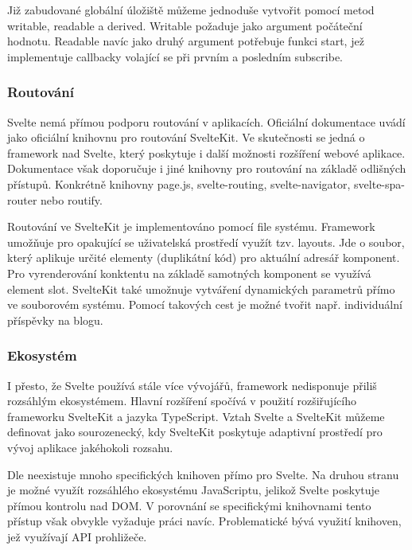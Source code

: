 Již zabudované globální úložiště můžeme jednoduše vytvořit pomocí metod writable, readable a derived. Writable požaduje jako argument počáteční hodnotu. 
Readable navíc jako druhý argument potřebuje funkci start, jež implementuje callbacky volající se při prvním a posledním subscribe.\cite{sveltehandbook,svelte,sveltestatemanagement}

\subsubsection{Routování}

Svelte nemá přímou podporu routování v aplikacích. Oficiální dokumentace uvádí jako oficiální knihovnu pro routování SvelteKit. 
Ve skutečnosti se jedná o framework nad Svelte, který poskytuje i další možnosti rozšíření webové aplikace. 
Dokumentace však doporučuje i jiné knihovny pro routování na základě odlišných přístupů. 
Konkrétně knihovny page.js, svelte-routing, svelte-navigator, svelte-spa-router nebo routify.\cite{svelte,svelteforbeginners}

Routování ve SvelteKit je implementováno pomocí file systému. Framework umožňuje pro opakující se uživatelská prostředí využít tzv. layouts. 
Jde o soubor, který aplikuje určité elementy (duplikátní kód) pro aktuální adresář komponent. Pro vyrenderování konktentu na základě samotných komponent se využívá element slot. 
SvelteKit také umožnuje vytváření dynamických parametrů přímo ve souborovém systému. Pomocí takových cest je možné tvořit např. individuální příspěvky na blogu.\cite{svelte}

\subsubsection{Ekosystém}

I přesto, že Svelte používá stále více vývojářů, framework nedisponuje přiliš rozsáhlým ekosystémem. Hlavní rozšíření spočívá v použití rozšiřujícího frameworku SvelteKit a jazyka TypeScript. 
Vztah Svelte a SvelteKit můžeme definovat jako sourozenecký, kdy SvelteKit poskytuje adaptivní prostředí pro vývoj aplikace jakéhokoli rozsahu.

Dle \cite{sveltedailydev} neexistuje mnoho specifických knihoven přímo pro Svelte. 
Na druhou stranu je možné využít rozsáhlého ekosystému JavaScriptu, jelikož Svelte poskytuje přímou kontrolu nad DOM. 
V porovnání se specifickými knihovnami tento přístup však obvykle vyžaduje práci navíc. 
Problematické bývá využití knihoven, jež využívají API prohližeče.\cite{svelteheyreliable,sveltedailydev,sveltejslibs}